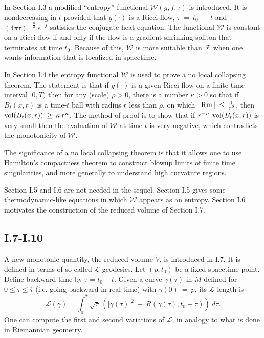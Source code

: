 In Section I.3 a modified ``entropy'' functional ${\mathcal W}(g,f,\tau)$ is
introduced.  It is nondecreasing in $t$ provided that $g(\cdot)$ is a Ricci flow,
$\tau \: = \: t_0 \: - \: t$ and $(4 \pi \tau)^{- \: \frac{n}{2}} \:
e^{-f}$ satisfies the conjugate heat equation. The functional
${\mathcal W}$ is constant on a Ricci flow if and only if the flow is a gradient
shrinking soliton that terminates at time $t_0$. Because of this,
${\mathcal W}$ is more suitable than ${\mathcal F}$ when one wants
information that is localized in spacetime.

In Section I.4 the entropy functional ${\mathcal W}$ is used to prove
a no local collapsing theorem. The statement is that if $g(\cdot)$ is a given
Ricci flow on a finite time interval $[0, T)$ then for any (scale) $\rho > 0$,
there is a number $\kappa > 0$ so that if $B_t(x,r)$ is a time-$t$ ball
with radius $r$ less than $\rho$, on which $|\operatorname{Rm}| \: \le \: \frac{1}{r^2}$,
then $\operatorname{vol}(B_t(x,r)) \: \ge \:
\kappa \: r^n$. The method of proof is to show that if
$r^{-n} \: \operatorname{vol}(B_t(x,r))$ is very small then the evaluation of ${\mathcal W}$
at time $t$ is very negative, which contradicts the monotonicity of
${\mathcal W}$.

The significance of a no local collapsing theorem is that it allows one to
use Hamilton's compactness theorem to construct blowup limits of finite time
singularities, and more generally to understand high curvature regions.

Section I.5 and I.6 are not needed in the sequel.  Section I.5 gives some
thermodynamic-like equations in which ${\mathcal W}$
appears as an entropy.  Section I.6 motivates the construction of the
reduced volume of Section I.7.

\subsection{I.7-I.10}

A new monotonic quantity, the reduced volume $\tilde{V}$,
is introduced in I.7.  It is defined in terms of so-called
${\mathcal L}$-geodesics. Let $(p, t_0)$ be a fixed spacetime point.
Define backward time by $\tau = t_0 -t$. Given a curve
$\gamma(\tau)$ in $M$ defined for $0 \le \tau \le \overline{\tau}$ (i.e.
going backward in real time) with $\gamma(0) \: = \: p$, its
${\mathcal L}$-length is
\begin{equation}
{\mathcal L}(\gamma) = \int_0^{\overline{\tau}} \sqrt{\tau} \:
\left( |\dot{\gamma}(\tau)|^2 \: + \: R(\gamma(\tau),t_0 - \tau) \right)
\: d\tau.
\end{equation}
One can compute the first and second variations of ${\mathcal L}$, in
analogy to what is done in Riemannian geometry.

